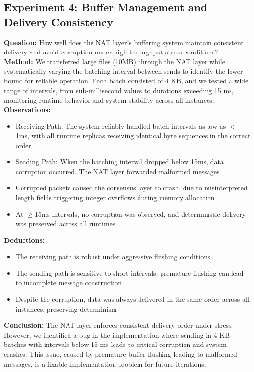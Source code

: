 \documentclass[10pt]{IEEEtran}
\begin{document}
\subsection{Experiment 4: Buffer Management and Delivery Consistency}
\textbf{Question:} How well does the NAT layer's buffering system maintain consistent delivery and avoid corruption under high-throughput stress conditions? \\
\textbf{Method:} We transferred large files (10MB) through the NAT layer while systematically varying the batching interval between sends to identify the lower bound for reliable operation. Each batch consisted of 4 KB, and we tested a wide range of intervals, from sub-millisecond values to durations exceeding 15 ms, monitoring runtime behavior and system stability across all instances. \\
\textbf{Observations:}
\begin{itemize}
    \item Receiving Path: The system reliably handled batch intervals as low as $<$1ms, with all runtime replicas receiving identical byte sequences in the correct order
    \item Sending Path: When the batching interval dropped below 15ms, data corruption occurred. The NAT layer forwarded malformed messages
    \item Corrupted packets caused the consensus layer to crash, due to misinterpreted length fields triggering integer overflows during memory allocation
    \item At $\geq$15ms intervals, no corruption was observed, and deterministic delivery was preserved across all runtimes
\end{itemize}
\textbf{Deductions:}
\begin{itemize}
    \item The receiving path is robust under aggressive flushing conditions
    \item The sending path is sensitive to short intervals; premature flushing can lead to incomplete message construction
    \item Despite the corruption, data was always delivered in the same order across all instances, preserving determinism
\end{itemize}
\textbf{Conclusion:} The NAT layer enforces consistent delivery order under stress. However, we identified a bug in the implementation where sending in 4 KB batches with intervals below 15 ms leads to critical corruption and system crashes. This issue, caused by premature buffer flushing leading to malformed messages, is a fixable implementation problem for future iterations.
\end{document}
